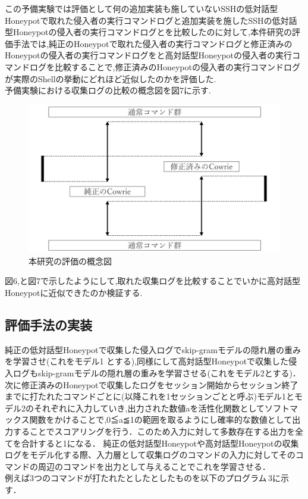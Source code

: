 この予備実験では評価として何の追加実装も施していないSSHの低対話型Honeypotで取れた侵入者の実行コマンドログと追加実装を施したSSHの低対話型Honeypotの侵入者の実行コマンドログとを比較したのに対して,本件研究の評価手法では,純正のHoneypotで取れた侵入者の実行コマンドログと修正済みのHoneypotの侵入者の実行コマンドログをと高対話型Honeypotの侵入者の実行コマンドログを比較することで,修正済みのHoneypotの侵入者の実行コマンドログが実際のShellの挙動にどれほど近似したのかを評価した.\\
予備実験における収集ログの比較の概念図を図7に示す.

\begin{figure}[H]
    \centering
    \includegraphics[width=1.0\textwidth]{figures/sotuhyoka.png}
    \caption{本研究の評価の概念図}
    \label{fig:evo}
\end{figure}

図6,と図7で示したようにして,取れた収集ログを比較することでいかに高対話型Honeypotに近似できたのか検証する.


\subsection{評価手法の実装}
\label{eval:impl}
純正の低対話型Honeypotで収集した侵入ログでskip-gramモデルの隠れ層の重みを学習させ(これをモデル1
とする),同様にして高対話型Honeypotで収集した侵入ログもskip-gramモデルの隠れ層の重みを学習させる(これをモデル2とする)．次に修正済みのHoneypotで収集したログをセッション開始からセッション終了までに打たれたコマンドごとに(以降これを1セッションごとと呼ぶ)モデル1とモデル2のそれぞれに入力していき,出力された数値aを活性化関数としてソフトマックス関数をかけることで,0≦a≦1の範囲を取るようにし確率的な数値として出力することでスコアリングを行う．このため入力に対して多数存在する出力を全てを合計すると1になる．
純正の低対話型Honeypotや高対話型Honeypotの収集ログをモデル化する際、入力層として収集ログのコマンドの入力に対してそのコマンドの周辺のコマンドを出力として与えることでこれを学習させる．\\
例えば3つのコマンドが打たれたとしたとしたものを以下のプログラム\,3に示す．

